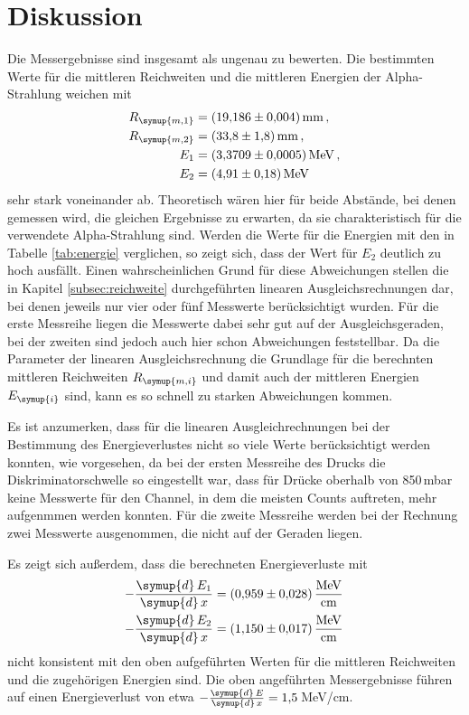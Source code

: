 \section{Diskussion}
\label{sec:Diskussion}

Die Messergebnisse sind insgesamt als ungenau zu bewerten. Die bestimmten Werte
für die mittleren Reichweiten und die mittleren Energien der Alpha-Strahlung
weichen mit
\begin{align*}
  R_{\symup{m,1}}&=\SI{19.186(0004)}{\milli\meter} \,, \\
  R_{\symup{m,2}}&=\SI{33.8(18)}{\milli\meter} \,, \\
  E_1&=\SI{3.3709(00005)}{\MeV} \,,\\
  E_2&=\SI{4.91(018)}{\MeV}
\end{align*}
sehr stark voneinander ab. Theoretisch wären hier für beide Abstände, bei denen gemessen
wird, die gleichen Ergebnisse zu erwarten, da sie charakteristisch für die verwendete
Alpha-Strahlung sind. Werden die Werte für die Energien mit den in Tabelle
\ref{tab:energie} verglichen, so zeigt sich, dass der Wert für $E_2$ deutlich zu
hoch ausfällt. Einen wahrscheinlichen Grund für diese Abweichungen stellen die in
Kapitel \ref{subsec:reichweite} durchgeführten linearen Ausgleichsrechnungen dar,
bei denen jeweils nur vier oder fünf Messwerte berücksichtigt wurden. Für die erste
Messreihe liegen die Messwerte dabei sehr gut auf der Ausgleichsgeraden, bei der
zweiten sind jedoch auch hier schon Abweichungen feststellbar. Da die Parameter
der linearen Ausgleichsrechnung die Grundlage für die berechnten mittleren Reichweiten
$R_{\symup{m,i}}$ und damit auch der mittleren Energien $E_{\symup{i}}$ sind, kann
es so schnell zu starken Abweichungen kommen.

Es ist anzumerken, dass für die linearen Ausgleichrechnungen bei der Bestimmung des
Energieverlustes nicht so viele Werte berücksichtigt werden konnten, wie vorgesehen,
da bei der ersten Messreihe des Drucks die Diskriminatorschwelle so eingestellt war, dass
für Drücke oberhalb von 850\,mbar keine Messwerte für den Channel, in dem die
meisten Counts auftreten, mehr aufgenmmen werden konnten. Für die zweite Messreihe
werden bei der Rechnung zwei Messwerte ausgenommen, die nicht auf der Geraden liegen.

Es zeigt sich außerdem, dass die berechneten Energieverluste mit
\begin{align*}
  -\frac{\symup{d}\,E_1}{\symup{d}\,x}&=\SI{0.959(028)}{\MeV\per\centi\meter} \,\\
  -\frac{\symup{d}\,E_2}{\symup{d}\,x}&=\SI{1.150(017)}{\MeV\per\centi\meter}
\end{align*}
nicht konsistent mit den oben aufgeführten Werten für die mittleren Reichweiten und
die zugehörigen Energien sind. Die oben angeführten Messergebnisse führen auf einen
Energieverlust von etwa $-\frac{\symup{d}\,E}{\symup{d}\,x}=1{,}5\,$MeV/cm.

